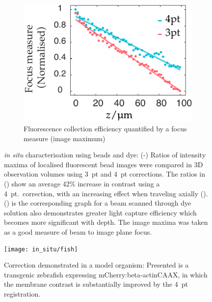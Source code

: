 \begin{figure}
\begin{subfigure}[t]{0.45\textwidth}
        \centering
        \includegraphics{in_situ/axial_travel_thesis}
        \caption{Fluorescence collection efficiency quantified by a focus measure (image maximum)}\label{fig:in_situ/axial_travel_thesis}
    \end{subfigure}
    \caption[\emph{in situ} characterisation using beads and dye]{\emph{in situ} characterisation using beads and dye:
    (-) Ratios of intensity maxima of localised fluorescent bead images
    were compared in \gls{3D} observation volumes %
    using 3~pt and 4~pt corrections.
    The ratios in () show an %
    average 42\% increase in contrast using a 4~pt.~correction, %
    with an increasing effect when traveling axially ().
    () is the corresponding graph for a beam scanned through dye solution also demonstrates greater light capture efficiency which becomes more significant with depth.
    The image maxima was taken as a good measure of beam to image plane focus.
    }\label{fig:in_situ}
\end{figure}

\begin{figure}
  \texttt{[image: in\_situ/fish]}
  \caption[Correction demonstrated in a model organism]{Correction demonstrated in a model organism:
  Presented is a transgenic \gls{zebrafish} expressing mCherry:beta-actinCAAX, in which the membrane contrast is substantially improved by the 4~pt registration.%
  }\label{fig:homofish}
\end{figure}

